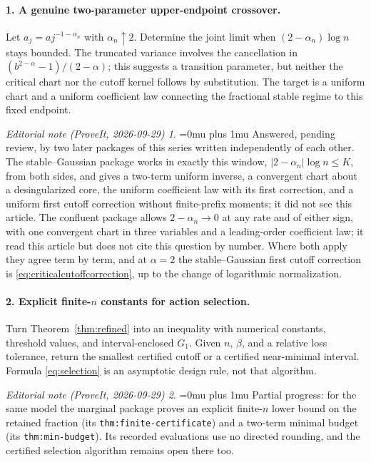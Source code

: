 \documentclass[11pt,a4paper]{article}
\numberwithin{equation}{section}
\theoremstyle{definition}
\theoremstyle{remark}
\newtheorem*{ednoteinner}{Editorial note (ProveIt, 2026-09-29)}
\newenvironment{ednote}{\begin{ednoteinner}\sloppy\Urlmuskip=0mu plus 1mu\relax}{\end{ednoteinner}}
\begin{document}
\paragraph{1. A genuine two-parameter upper-endpoint crossover.}
Let $a_j=a j^{-1-\alpha_n}$ with $\alpha_n\uparrow2$. Determine the
joint limit when $(2-\alpha_n)\log n$ stays bounded. The truncated
variance involves the cancellation in
$(b^{2-\alpha}-1)/(2-\alpha)$; this suggests a transition parameter,
but neither the critical chart nor the cutoff kernel follows by
substitution. The target is a uniform chart and a uniform coefficient
law connecting the fractional stable regime to this fixed endpoint.
\begin{ednote}
Answered, pending review, by two later packages of this series written
independently of each other. The stable--Gaussian package \cite{ed:sge}
works in exactly this window, $|2-\alpha_n|\log n\le K$, from both sides,
and gives a two-term uniform inverse, a convergent chart about a
desingularized core, the uniform coefficient law with its first
correction, and a uniform first cutoff correction without finite-prefix
moments; it did not see this article. The confluent package \cite{ed:cct}
allows $2-\alpha_n\to0$ at any rate and of either sign, with one
convergent chart in three variables and a leading-order coefficient law;
it read this article but does not cite this question by number. Where both
apply they agree term by term, and at $\alpha=2$ the stable--Gaussian
first cutoff correction is \eqref{eq:criticalcutoffcorrection}, up to the
change of logarithmic normalization.
\end{ednote}

\paragraph{2. Explicit finite-$n$ constants for action selection.}
Turn Theorem~\ref{thm:refined} into an inequality with numerical
constants, threshold values, and interval-enclosed $G_1$. Given $n$,
$\beta$, and a relative loss tolerance, return the smallest certified
cutoff or a certified near-minimal interval. Formula
\eqref{eq:selection} is an asymptotic design rule, not that algorithm.
\begin{ednote}
Partial progress: for the same model the marginal package \cite{ed:mct}
proves an explicit finite-$n$ lower bound on the retained fraction (its
\texttt{thm:finite-certificate}) and a two-term minimal budget (its
\texttt{thm:min-budget}). Its recorded evaluations use no directed rounding,
and the certified selection algorithm remains open there too.
\end{ednote}
\end{document}

